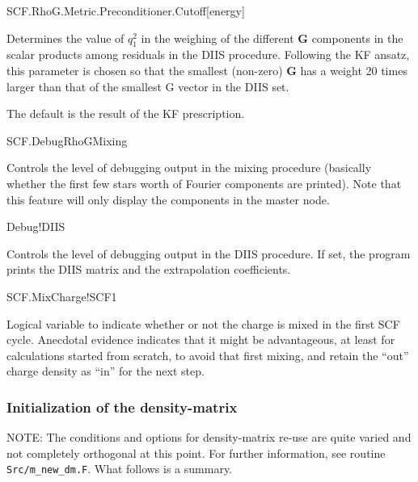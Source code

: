 \begin{fdfentry}{SCF.RhoG.Metric.Preconditioner.Cutoff}[energy]

  Determines the value of $q_1^2$ in the weighing of the different \textbf{G}
  components in the scalar products among residuals in the DIIS
  procedure. Following the KF ansatz, this parameter is chosen so that
  the smallest (non-zero) \textbf{G} has a weight 20 times larger than that of
  the smallest G vector in the DIIS set. 

  The default is the result of the KF prescription.

\end{fdfentry}

\begin{fdflogicalF}{SCF.DebugRhoGMixing}

  Controls the level of debugging output in the mixing procedure
  (basically whether the first few stars worth of Fourier components are
  printed). Note that this feature will only display the components in
  the master node.

\end{fdflogicalF} 


\begin{fdflogicalF}{Debug!DIIS}

  Controls the level of debugging output in the DIIS procedure. If set,
  the program prints the DIIS matrix and the extrapolation coefficients.
  
\end{fdflogicalF}

\begin{fdflogicalF}{SCF.MixCharge!SCF1}


  Logical variable to indicate whether or not the charge is mixed in the
  first SCF cycle. Anecdotal evidence indicates that it might be
  advantageous, at least for calculations started from scratch, to avoid
  that first mixing, and retain the ``out'' charge density as ``in'' for
  the next step. 

\end{fdflogicalF}



\subsubsection{Initialization of the density-matrix}

NOTE: The conditions and options for density-matrix re-use are quite
varied and not completely orthogonal at this point. For further
information, see routine \texttt{Src/m\_new\_dm.F}. What follows is a
summary.

